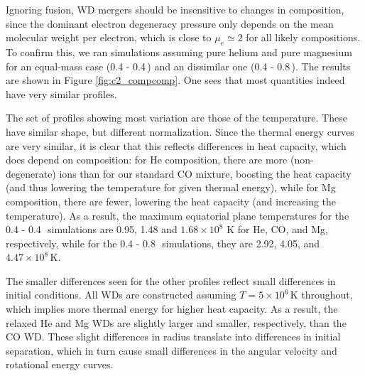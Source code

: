Ignoring fusion, WD mergers should be insensitive to changes in composition, since the dominant electron degeneracy pressure only depends on the mean molecular weight per electron, which is close to $\mu_e\simeq2$ for all likely compositions.  To confirm this, we ran simulations assuming pure helium and pure magnesium for an equal-mass case (0.4 - 0.4\,\Msun) and an dissimilar one (0.4 - 0.8\,\Msun).  The results are shown in Figure \ref{fig:c2_compcomp}.  One sees that most quantities indeed have very similar profiles.

The set of profiles showing most variation are those of the temperature.  These have similar shape, but different normalization.  Since the thermal energy curves are very similar, it is clear that this reflects differences in heat capacity, which does depend on composition: for He composition, there are more (non-degenerate) ions than for our standard CO mixture, boosting the heat capacity (and thus lowering the temperature for given thermal energy), while for Mg composition, there are fewer, lowering the heat capacity (and increasing the temperature).  As a result, the maximum equatorial plane temperatures for the 0.4 - 0.4\,\Msun\ simulations are 0.95, 1.48 and $1.68\times10^8$ K for He, CO, and Mg, respectively, while for the 0.4 - 0.8\,\Msun\ simulations, they are 2.92, 4.05, and $4.47\times10^8\,$K.


The smaller differences seen for the other profiles reflect small differences in initial conditions.  All WDs are constructed assuming $T=5\times10^6\,$K throughout, which implies more thermal energy for higher heat capacity.  As a result, the relaxed He and Mg WDs are slightly larger and smaller, respectively, than the CO WD.  These slight differences in radius translate into differences in initial separation, which in turn cause small differences in the angular velocity and rotational energy curves.

